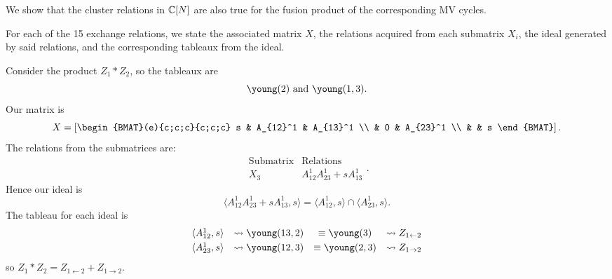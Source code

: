 \documentclass{article} %
\begin{document}
We show that the cluster relations in $\mathbb C[N]$ are also true for the fusion product of the corresponding MV cycles.

For each of the 15 exchange relations, we state the associated matrix $X$, the relations acquired from each submatrix $X_i$, the ideal generated by said relations, and the corresponding tableaux from the ideal.



\begin{example}
Consider the product $Z_1 * Z_2$, so the tableaux are
\[
\young(2) \text{ and } \young(1,3).
\]
Our matrix is
\[
X = \left[\begin{BMAT}(e){c;c;c}{c;c;c}
    s & A_{12}^1 & A_{13}^1 \\
     & 0 & A_{23}^1 \\
     & & s
\end{BMAT}
\right].
\]
The relations from the submatrices are:
\[
\begin{array}{c|c}
    \text{Submatrix} & \text{Relations} \\ \hline
    X_3 & A_{12}^1A_{23}^1+sA_{13}^1
\end{array}.
\]
Hence our ideal is
$$\langle A_{12}^1A_{23}^1+sA_{13}^1,s \rangle = 
\langle A_{12}^1,s \rangle \cap \langle A_{23}^1,s \rangle.$$
The tableau for each ideal is
\[\begin{array}{cccc}\vspace{1mm}
    \langle A_{12}^1,s \rangle &\leadsto \young(13,2) &\equiv \young(3) &\leadsto {Z_{1 \leftarrow 2}} \\ 
    \langle A_{23}^1,s \rangle &\leadsto \young(12,3) &\equiv \young(2,3) &\leadsto{Z_{1 \rightarrow 2}}
\end{array}
\]
so $Z_1 * Z_2 = Z_{1 \leftarrow 2} + Z_{1 \rightarrow 2}$.
\end{example}
\end{document}
